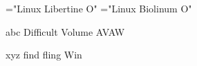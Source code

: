




\font\llrm="Linux Libertine O"
\font\lbsf="Linux Biolinum O"

{\llrm abc Difficult Volume AVAW}

{\lbsf xyz find fling Win}

\bye